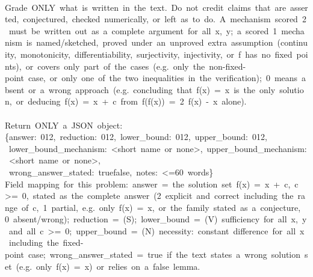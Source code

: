\begin{flushleft}
\mbox{}\\
{}Grade\ ONLY\ what\ is\ written\ in\ the\ text.\ Do\ not\ credit\ claims\ that\ are\ asserted,\ conjectured,\ checked\ numerically,\ or\ left\ as\ \textquotedbl{}to\ do\textquotedbl{}.\ A\ mechanism\ scored\ 2\ must\ be\ written\ out\ as\ a\ complete\ argument\ for\ all\ x,\ y;\ a\ scored\ 1\ mechanism\ is\ named/sketched,\ proved\ under\ an\ unproved\ extra\ assumption\ (continuity,\ monotonicity,\ differentiability,\ surjectivity,\ injectivity,\ or\ \textquotedbl{}f\ has\ no\ fixed\ points\textquotedbl{}),\ or\ covers\ only\ part\ of\ the\ cases\ (e.g.\ only\ the\ non-{}fixed-{}point\ case,\ or\ only\ one\ of\ the\ two\ inequalities\ in\ the\ verification);\ 0\ means\ absent\ or\ a\ wrong\ approach\ (e.g.\ concluding\ that\ f(x)\ =\ x\ is\ the\ only\ solution,\ or\ deducing\ f(x)\ =\ x\ +\ c\ from\ f(f(x))\ =\ 2\ f(x)\ -{}\ x\ alone).\\
\mbox{}\\
{}Return\ ONLY\ a\ JSON\ object:\\
{}\{\textquotedbl{}answer\textquotedbl{}:\ 0\textbar{}1\textbar{}2,\ \textquotedbl{}reduction\textquotedbl{}:\ 0\textbar{}1\textbar{}2,\ \textquotedbl{}lower\_bound\textquotedbl{}:\ 0\textbar{}1\textbar{}2,\ \textquotedbl{}upper\_bound\textquotedbl{}:\ 0\textbar{}1\textbar{}2,\\
{}\ \textquotedbl{}lower\_bound\_mechanism\textquotedbl{}:\ \textquotedbl{}\textless{}short\ name\ or\ \textquotesingle{}none\textquotesingle{}\textgreater{}\textquotedbl{},\ \textquotedbl{}upper\_bound\_mechanism\textquotedbl{}:\ \textquotedbl{}\textless{}short\ name\ or\ \textquotesingle{}none\textquotesingle{}\textgreater{}\textquotedbl{},\\
{}\ \textquotedbl{}wrong\_answer\_stated\textquotedbl{}:\ true\textbar{}false,\ \textquotedbl{}notes\textquotedbl{}:\ \textquotedbl{}\textless{}=60\ words\textquotedbl{}\}\\
{}Field\ mapping\ for\ this\ problem:\ \textquotedbl{}answer\textquotedbl{}\ =\ the\ solution\ set\ f(x)\ =\ x\ +\ c,\ c\ \textgreater{}=\ 0,\ stated\ as\ the\ complete\ answer\ (2\ explicit\ and\ correct\ including\ the\ range\ of\ c,\ 1\ partial,\ e.g.\ only\ f(x)\ =\ x,\ or\ the\ family\ stated\ as\ a\ conjecture,\ 0\ absent/wrong);\ \textquotedbl{}reduction\textquotedbl{}\ =\ (S);\ \textquotedbl{}lower\_bound\textquotedbl{}\ =\ (V)\ sufficiency\ for\ all\ x,\ y\ and\ all\ c\ \textgreater{}=\ 0;\ \textquotedbl{}upper\_bound\textquotedbl{}\ =\ (N)\ necessity:\ constant\ difference\ for\ all\ x\ including\ the\ fixed-{}point\ case;\ \textquotedbl{}wrong\_answer\_stated\textquotedbl{}\ =\ true\ if\ the\ text\ states\ a\ wrong\ solution\ set\ (e.g.\ only\ f(x)\ =\ x)\ or\ relies\ on\ a\ false\ lemma.\\
\end{flushleft}
